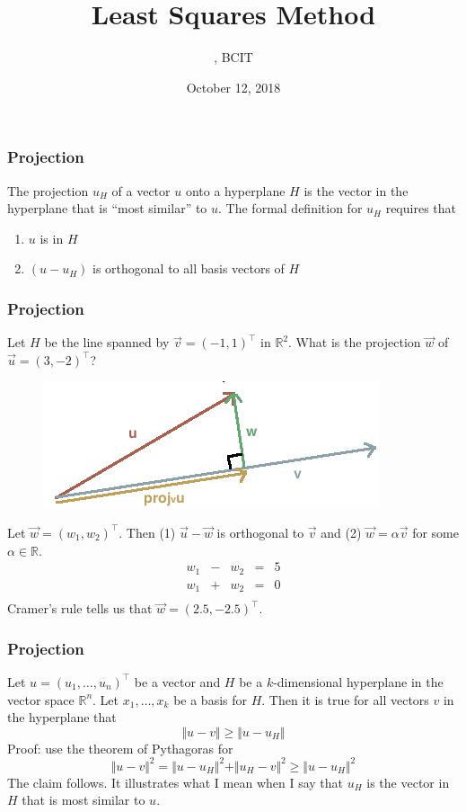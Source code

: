 \documentclass[xcolor=dvipsnames]{beamer}
\title{Least Squares Method}
\subtitle{{\CourseNumber}, BCIT}
\author{\CourseName}
\date{October 12, 2018}
\begin{document}
\begin{frame}
  \titlepage
\end{frame}

\begin{frame}
  \frametitle{Projection}
  The \alert{projection} $u_{H}$ of a vector $u$ onto a hyperplane $H$
  is the vector in the hyperplane that is ``most similar'' to $u$. The
  formal definition for $u_{H}$ requires that
  \begin{enumerate}
  \item $u$ is in $H$
  \item $(u-u_{H})$ is orthogonal to all basis vectors of $H$
  \end{enumerate}
\end{frame}

\begin{frame}
  \frametitle{Projection}
   Let $H$ be the line spanned by
  $\vec{v}=(-1,1)^{\intercal}$ in $\mathbb{R}^{2}$. What is the
  projection $\vec{w}$ of $\vec{u}=(3,-2)^{\intercal}$?
    \begin{figure}[h]
    \includegraphics[scale=0.32]{./diagrams/project.png}
  \end{figure}
  Let $\vec{w}=(w_{1},w_{2})^{\intercal}$. Then (1) $\vec{u}-\vec{w}$
  is orthogonal to $\vec{v}$ and (2) $\vec{w}=\alpha\vec{v}$ for some
  $\alpha\in\mathbb{R}$.
  \begin{equation}
    \label{eq:vorahcat}
    \begin{array}{ccccc}
      w_{1}&-&w_{2}&=&5 \\
      w_{1}&+&w_{2}&=&0 \\
    \end{array}
  \end{equation}
Cramer's rule tells us that $\vec{w}=(2.5,-2.5)^{\intercal}$. 
\end{frame}

\begin{frame}
  \frametitle{Projection}
  Let $u=(u_{1},{\ldots},u_{n})^{\intercal}$ be a vector and $H$ be a
  $k$-dimensional hyperplane in the vector space $\mathbb{R}^{n}$. Let
  $x_{1},{\ldots},x_{k}$ be a basis for $H$. Then it is true for all
  vectors $v$ in the hyperplane that
  \begin{equation}
    \label{eq:ahdoogoh}
    \Vert{}u-v\Vert\geq\Vert{}u-u_{H}\Vert
  \end{equation}
  Proof: use the theorem of Pythagoras for
  \begin{equation}
    \label{eq:yoochaev}
    \Vert{}u-v\Vert^{2}=\Vert{}u-u_{H}\Vert^{2}+\Vert{}u_{H}-v\Vert^{2}\geq\Vert{}u-u_{H}\Vert^{2}
  \end{equation}
The claim follows. It illustrates what I mean when I say that $u_{H}$
is the vector in $H$ that is most similar to $u$. 
\end{frame}
\end{document}
